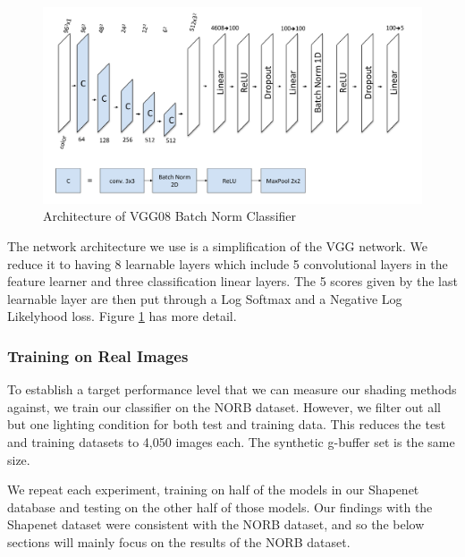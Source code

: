 \documentclass[10pt,twocolumn,letterpaper]{article}
\begin{document}
\begin{figure}[h!]
\centering
\includegraphics[width=1.0\columnwidth]{./assets/vgg08_diagram.pdf}
\caption{Architecture of VGG08 Batch Norm Classifier}
\label{fig:VGG_DAIGRAM}
\end{figure}
The network architecture we use is a simplification of the VGG network\cite{DBLP:journals/corr/SimonyanZ14a}.  We reduce it to having 8 learnable layers which include 5 convolutional layers in the feature learner and three classification linear layers.   
The 5 scores given by the last learnable layer are then put through a Log Softmax and a Negative Log Likelyhood loss. %
Figure \ref{fig:VGG_DAIGRAM} has more detail.\\

\subsubsection{Training on Real Images}
To establish a target performance level that we can measure our shading methods against, we train our classifier on the NORB dataset. However, we filter out all but one lighting condition for both test and training data.  This reduces the test and training datasets to 4,050 images each.  The synthetic g-buffer set is the same size.

 We repeat each experiment, training on half of the models in our Shapenet database and testing on the other half of those models. Our findings with the Shapenet dataset were consistent with the NORB dataset, and so the below sections will mainly focus on the results of the NORB dataset.
\end{document}
